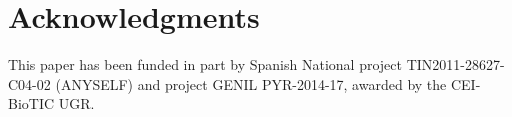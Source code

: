 \documentclass[conference]{IEEEtran}
\begin{document}
\section{Acknowledgments}
This paper has been funded in part by Spanish National project TIN2011-28627-C04-02 (ANYSELF) and project GENIL PYR-2014-17, awarded by the CEI-BioTIC UGR.



\end{document}
